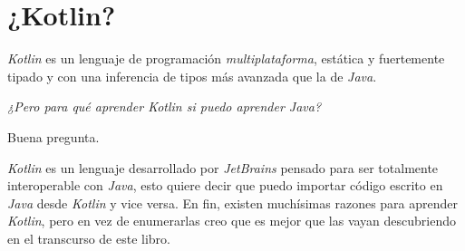\section{¿Kotlin?}
  \textit{Kotlin} es un lenguaje de programación \textit{multiplataforma}, estática y 
  fuertemente tipado y con una inferencia de tipos más avanzada que la de \textit{Java}.

  \begin{center}
    \textit{¿Pero para qué aprender Kotlin si puedo aprender Java?}
  \end{center}

  Buena pregunta.
  \vfill
  \newpage

  \textit{Kotlin} es un lenguaje desarrollado por \textit{JetBrains} pensado para ser totalmente 
  interoperable con \textit{Java}, esto quiere decir que puedo importar código escrito en 
  \textit{Java} desde \textit{Kotlin} y vice versa.
  En fin, existen muchísimas razones para aprender \textit{Kotlin}, pero en vez de enumerarlas creo
  que es mejor que las vayan descubriendo en el transcurso de este libro.
